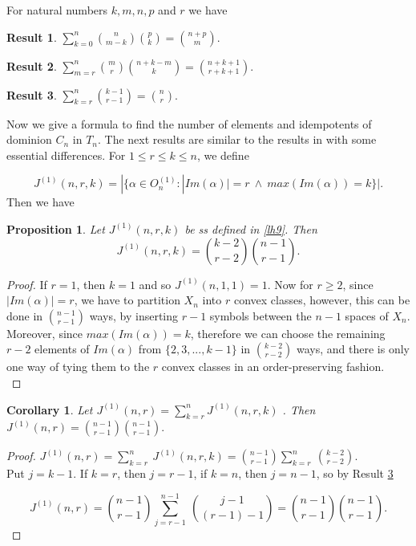 \documentclass[10pt]{extarticle}
\numberwithin{equation}{section}
\numberwithin{bbb}{section}
\newtheorem{proposition}{Proposition}[section]
\newtheorem{corollary}{Corollary}[section]
\newtheorem{result}{Result}[section]
\numberwithin{equation}{section}
\begin{document}
\vspace{0.3cm}
For natural numbers $k, m, n, p$ and $r$ we have

\vspace{0.3cm}
\begin{result} \cite{ria} \label{one}
    $\sum_{k=0}^{n}\binom{n}{m-k}\binom{p}{k}=\binom{n+p}{m}.$
\end{result}

\begin{result} \cite{ria} \label{three}
  $\sum_{m=r}^{n}\binom{m}{r}\binom{n+k-m}{k}=\binom{n+k+1}{r+k+1}.$
\end{result}

\begin{result} \cite{lupt} \label{five}
   $\sum_{k=r}^{n}\binom{k-1}{r-1}=\binom{n}{r}.$ 
\end{result}

\vspace{0.5cm}
Now we give a formula to find the number of elements and idempotents of dominion $C_n$ in $T_n$. The next results are similar to the results in \cite{nrk} with some essential differences. For $1 \leq r \leq k \leq n$, we define

\begin{equation}
 J^{(1)}(n,r,k)=|\{\alpha \in O_n^{(1)} : |Im(\alpha)|=r \ \wedge \ max(Im(\alpha))=k\}|.   \label{lh9}
\end{equation}
Then we have

\vspace{0.2cm}
\begin{proposition}
    Let $J^{(1)}(n,r,k)$ be ss defined in \eqref{lh9}. Then
    $$J^{(1)}(n,r,k)=\binom{k-2}{r-2}\binom{n-1}{r-1}.$$
\end{proposition}
\begin{proof}
If $r=1$, then $k=1$ and so $J^{(1)}(n,1,1)=1$. Now for $r\geq 2$, since $|Im(\alpha)|=r$, we have to partition $X_n$ into $r$ convex classes, however, this can be done in $\binom{n-1}{r-1}$ ways, by inserting $r-1$ symbols between the $n-1$ spaces of $X_n$. Moreover, since $max(Im(\alpha))=k$, therefore we can choose the remaining $r-2$ elements of $Im(\alpha)$ from $\{2,3,...,k-1\}$ in $\binom{k-2}{r-2}$ ways, and there is only one way of tying them to the $r$ convex classes in an order-preserving fashion.\\
\end{proof}

\begin{corollary}
 Let $J^{(1)}(n,r)=\sum_{k=r}^{n}J^{(1)}(n,r,k)$ . Then $J^{(1)}(n,r)=\binom{n-1}{r-1}\binom{n-1}{r-1}.$
\end{corollary}
\begin{proof}
$J^{(1)}(n,r)=\sum_{k=r}^{n} \ J^{(1)}(n,r,k)=\binom{n-1}{r-1}\sum_{k=r}^{n} \ \binom{k-2}{r-2}.$\\[10pt]
Put $j=k-1$. If $k=r$, then $j=r-1$, if $k=n$, then $j=n-1$, so by Result \ref{five}

$$J^{(1)}(n,r)=\binom{n-1}{r-1}\sum_{j=r-1}^{n-1} \ \binom{j-1}{(r-1)-1}=\binom{n-1}{r-1}\binom{n-1}{r-1}.$$
\end{proof}
\end{document}
